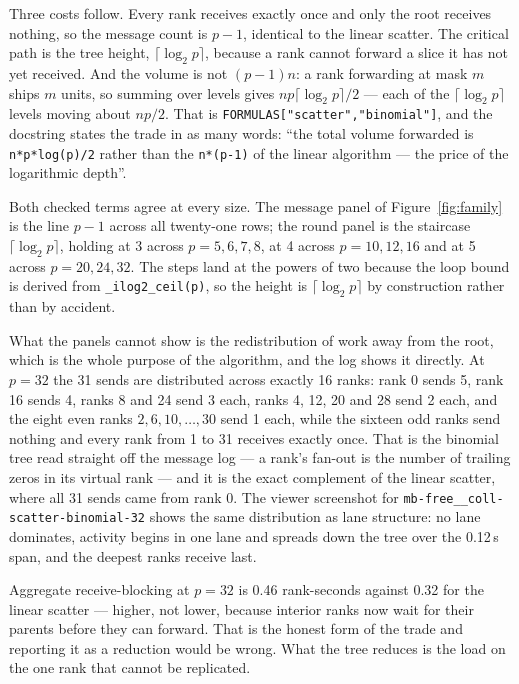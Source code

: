\documentclass[11pt]{article}
\begin{document}
Three costs follow. Every rank receives exactly once and only the root receives nothing, so the
message count is $p-1$, identical to the linear scatter. The critical path is the tree height,
$\lceil\log_2 p\rceil$, because a rank cannot forward a slice it has not yet received. And the
volume is not $(p-1)n$: a rank forwarding at mask $m$ ships $m$ units, so summing over levels gives
$np\lceil\log_2 p\rceil/2$ --- each of the $\lceil\log_2 p\rceil$ levels moving about $np/2$. That
is \texttt{FORMULAS["scatter","binomial"]}, and the docstring states the trade in as many words:
``the total volume forwarded is \texttt{n*p*log(p)/2} rather than the \texttt{n*(p-1)} of the
linear algorithm --- the price of the logarithmic depth''.

Both checked terms agree at every size. The message panel of Figure~\ref{fig:family} is the line
$p-1$ across all twenty-one rows; the round panel is the staircase $\lceil\log_2 p\rceil$, holding
at 3 across $p = 5,6,7,8$, at 4 across $p = 10,12,16$ and at 5 across $p = 20,24,32$. The steps
land at the powers of two because the loop bound is derived from
\texttt{\_ilog2\_ceil(p)}, so the height is $\lceil\log_2 p\rceil$ by construction rather than by
accident.

What the panels cannot show is the redistribution of work away from the root, which is the whole
purpose of the algorithm, and the log shows it directly. At $p=32$ the 31 sends are distributed
across exactly 16 ranks: rank 0 sends 5, rank 16 sends 4, ranks 8 and 24 send 3 each, ranks 4, 12,
20 and 28 send 2 each, and the eight even ranks $2, 6, 10, \ldots, 30$ send 1 each, while the
sixteen odd ranks send nothing and every rank from 1 to 31 receives exactly once. That is the
binomial tree read straight off the message log --- a rank's fan-out is the number of trailing
zeros in its virtual rank --- and it is the exact complement of the linear scatter, where all 31
sends came from rank 0. The viewer
screenshot for \texttt{mb-free\_\_coll-scatter-binomial-32} shows the same distribution as lane
structure: no lane dominates, activity begins in one lane and spreads down the tree over the
0.12\,s span, and the deepest ranks receive last.

Aggregate receive-blocking at $p=32$ is 0.46 rank-seconds against 0.32 for the linear scatter ---
higher, not lower, because interior ranks now wait for their parents before they can forward. That
is the honest form of the trade and reporting it as a reduction would be wrong. What the tree
reduces is the load on the one rank that cannot be replicated.
\end{document}
